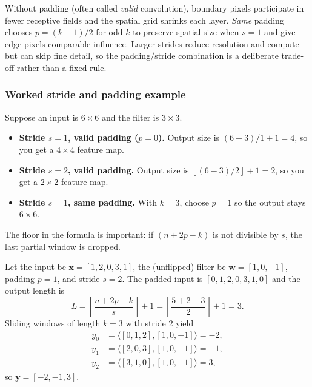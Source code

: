 Without padding (often called \emph{valid} convolution), boundary pixels participate in fewer receptive fields and the spatial grid shrinks each layer. \emph{Same} padding chooses \(p=(k-1)/2\) for odd \(k\) to preserve spatial size when \(s=1\) and give edge pixels comparable influence. Larger strides reduce resolution and compute but can skip fine detail, so the padding/stride combination is a deliberate trade-off rather than a fixed rule.

\subsubsection{Worked stride and padding example}
\label{sec:cnn_worked_stride_and_padding_example_sub}

Suppose an input is \(6\times6\) and the filter is \(3\times3\).
\begin{itemize}
    \item \textbf{Stride \(s=1\), valid padding (\(p=0\)).} Output size is \((6-3)/1 + 1 = 4\), so you get a \(4\times4\) feature map.
    \item \textbf{Stride \(s=2\), valid padding.} Output size is \(\left\lfloor(6-3)/2\right\rfloor + 1 = 2\), so you get a \(2\times2\) feature map.
    \item \textbf{Stride \(s=1\), same padding.} With \(k=3\), choose \(p=1\) so the output stays \(6\times6\).
\end{itemize}
The floor in the formula is important: if \((n + 2p - k)\) is not divisible by \(s\), the last partial window is dropped.

\begin{tcolorbox}[summarybox, title={Worked example: 1D cross-correlation values (stride + padding)}]
Let the input be \(\mathbf{x}=[1,2,0,3,1]\), the (unflipped) filter be \(\mathbf{w}=[1,0,-1]\), padding \(p=1\), and stride \(s=2\). The padded input is \([0,1,2,0,3,1,0]\) and the output length is
\[
L=\left\lfloor\frac{n+2p-k}{s}\right\rfloor+1=\left\lfloor\frac{5+2-3}{2}\right\rfloor+1=3.
\]
Sliding windows of length \(k=3\) with stride \(2\) yield
\[
\begin{aligned}
y_0 &= \langle[0,1,2],[1,0,-1]\rangle = -2,\\
y_1 &= \langle[2,0,3],[1,0,-1]\rangle = -1,\\
y_2 &= \langle[3,1,0],[1,0,-1]\rangle = 3,
\end{aligned}
\]
so \(\mathbf{y}=[-2,-1,3]\).
\end{tcolorbox}

